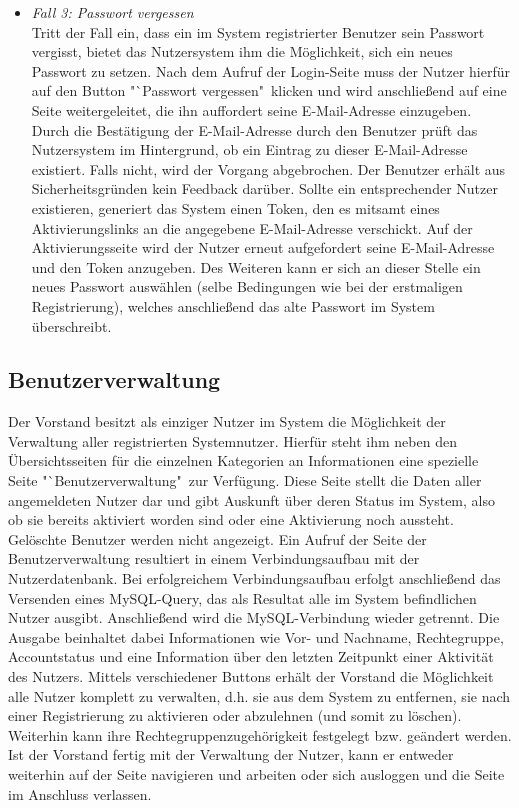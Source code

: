 \documentclass[fontsize = 12pt, paper = a4]{scrreprt}
\begin{document}
\begin{itemize}

\item \textit{Fall 3: Passwort vergessen} \\
Tritt der Fall ein, dass ein im System registrierter Benutzer sein Passwort vergisst, bietet das Nutzersystem ihm die Möglichkeit, sich ein neues Passwort zu setzen. Nach dem Aufruf der Login-Seite muss der Nutzer hierfür auf den Button "`Passwort vergessen"\ klicken und wird anschließend auf eine Seite weitergeleitet, die ihn auffordert seine E-Mail-Adresse einzugeben. Durch die Bestätigung der E-Mail-Adresse durch den Benutzer prüft das Nutzersystem im Hintergrund, ob ein Eintrag zu dieser E-Mail-Adresse existiert. Falls nicht, wird der Vorgang abgebrochen. Der Benutzer erhält aus Sicherheitsgründen kein Feedback darüber. Sollte ein entsprechender Nutzer existieren, generiert das System einen Token, den es mitsamt eines Aktivierungslinks an die angegebene E-Mail-Adresse verschickt. Auf der Aktivierungsseite wird der Nutzer erneut aufgefordert seine E-Mail-Adresse und den Token anzugeben. Des Weiteren kann er sich an dieser Stelle ein neues Passwort auswählen (selbe Bedingungen wie bei der erstmaligen Registrierung), welches anschließend das alte Passwort im System überschreibt.

\end{itemize}

\newpage

\subsection{Benutzerverwaltung}

Der Vorstand besitzt als einziger Nutzer im System die Möglichkeit der Verwaltung aller registrierten Systemnutzer. Hierfür steht ihm neben den Übersichtsseiten für die einzelnen Kategorien an Informationen eine spezielle Seite "`Benutzerverwaltung"\ zur Verfügung. Diese Seite stellt die Daten aller angemeldeten Nutzer dar und gibt Auskunft über deren Status im System, also ob sie bereits aktiviert worden sind oder eine Aktivierung noch aussteht. Gelöschte Benutzer werden nicht angezeigt. Ein Aufruf der Seite der Benutzerverwaltung resultiert in einem Verbindungsaufbau mit der Nutzerdatenbank. Bei erfolgreichem Verbindungsaufbau erfolgt anschließend das Versenden eines MySQL-Query, das als Resultat alle im System befindlichen Nutzer ausgibt. Anschließend wird die MySQL-Verbindung wieder getrennt. Die Ausgabe beinhaltet dabei Informationen wie Vor- und Nachname, Rechtegruppe, Accountstatus und eine Information über den letzten Zeitpunkt einer Aktivität des Nutzers. Mittels verschiedener Buttons erhält der Vorstand die Möglichkeit alle Nutzer komplett zu verwalten, d.h. sie aus dem System zu entfernen, sie nach einer Registrierung zu aktivieren oder abzulehnen (und somit zu löschen). Weiterhin kann ihre Rechtegruppenzugehörigkeit festgelegt bzw. geändert werden. Ist der Vorstand fertig mit der Verwaltung der Nutzer, kann er entweder weiterhin auf der Seite navigieren  und arbeiten oder sich ausloggen und die Seite im Anschluss verlassen.
\end{document}
